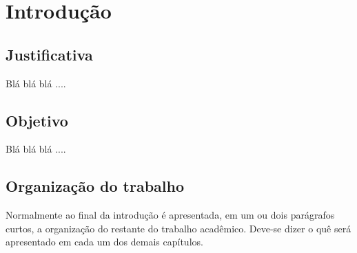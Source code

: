 


\chapter{Introdução}
\label{chap:introducao}

\section{Justificativa}
\label{sec:justificativa}

Blá blá blá .... 



\section{Objetivo}
\label{sec:objetivo}

Blá blá blá ....

\section{Organização do trabalho}
\label{sec:organizacaoTrabalho}


Normalmente ao final da introdução é apresentada, em um ou dois parágrafos curtos, a organização do restante do trabalho acadêmico. Deve-se dizer o quê será apresentado em cada um dos demais capítulos.

